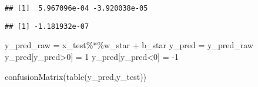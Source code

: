 \documentclass[
]{article}
\newenvironment{Shaded}{\begin{snugshade}}{\end{snugshade}}
\newcommand{\CommentTok}[1]{\textcolor[rgb]{0.56,0.35,0.01}{\textit{#1}}}
\newcommand{\DecValTok}[1]{\textcolor[rgb]{0.00,0.00,0.81}{#1}}
\newcommand{\FunctionTok}[1]{\textcolor[rgb]{0.00,0.00,0.00}{#1}}
\newcommand{\NormalTok}[1]{#1}
\newcommand{\OtherTok}[1]{\textcolor[rgb]{0.56,0.35,0.01}{#1}}
\newcommand{\SpecialCharTok}[1]{\textcolor[rgb]{0.00,0.00,0.00}{#1}}
\begin{document}
\begin{Shaded}
\end{Shaded}

\begin{verbatim}
## [1]  5.967096e-04 -3.920038e-05
\end{verbatim}

\begin{Shaded}
\end{Shaded}

\begin{verbatim}
## [1] -1.181932e-07
\end{verbatim}

\begin{Shaded}
\begin{Highlighting}[]
\NormalTok{y\_pred\_raw }\OtherTok{=}\NormalTok{ x\_test}\SpecialCharTok{\%*\%}\NormalTok{w\_star }\SpecialCharTok{+}\NormalTok{ b\_star}
\NormalTok{y\_pred }\OtherTok{=}\NormalTok{ y\_pred\_raw}
\NormalTok{y\_pred[y\_pred}\SpecialCharTok{\textgreater{}}\DecValTok{0}\NormalTok{] }\OtherTok{=} \DecValTok{1}
\NormalTok{y\_pred[y\_pred}\SpecialCharTok{\textless{}}\DecValTok{0}\NormalTok{] }\OtherTok{=} \SpecialCharTok{{-}}\DecValTok{1}

\FunctionTok{confusionMatrix}\NormalTok{(}\FunctionTok{table}\NormalTok{(y\_pred,y\_test))}
\end{Highlighting}
\end{Shaded}
\end{document}

